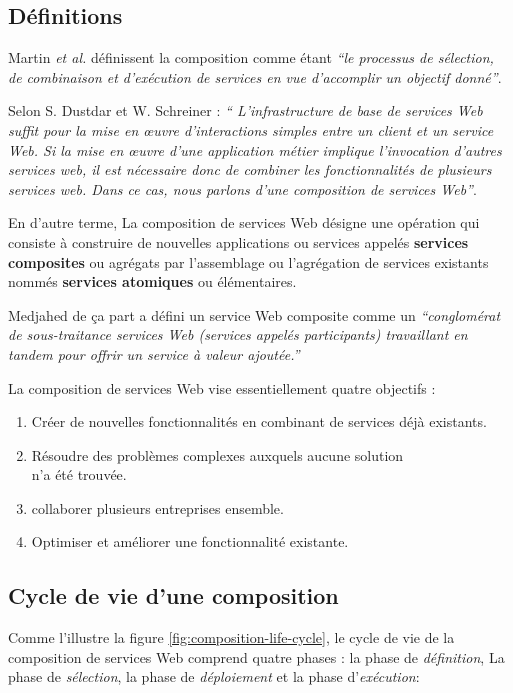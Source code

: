   \subsection{Définitions}
  \label{sec:definitions}
  Martin \emph{et al.} \cite{martin2004owl} définissent la composition
  comme étant \emph{``le processus de sélection, de combinaison et
    d'exécution de services en vue d'accomplir un objectif
    donné''}.\bigskip

  Selon S. Dustdar et W. Schreiner \cite{dustdar2005survey} : \emph{``
    L'infrastructure de base de services Web suffit pour la mise en
    œuvre d'interactions simples entre un client et un service Web. Si
    la mise en œuvre d'une application métier implique l'invocation
    d'autres services web, il est nécessaire donc de combiner les
    fonctionnalités de plusieurs services web. Dans ce cas, nous
    parlons d'une composition de services Web''}.\bigskip

  En d'autre terme, La composition de services Web désigne une
  opération qui consiste à construire de nouvelles applications ou
  services appelés \textbf{services composites} ou agrégats par
  l'assemblage ou l'agrégation de services existants nommés
  \textbf{services atomiques} ou élémentaires.\bigskip

  Medjahed \cite{medjahed2004thesis} de ça part a défini un service
  Web composite comme un \emph{``conglomérat de sous-traitance
    services Web (services appelés participants) travaillant en tandem
    pour offrir un service à valeur ajoutée.''}\bigskip

  La composition de services Web vise essentiellement quatre objectifs
  \cite{driss2011approche}:

  \begin{enumerate}
  \item Créer de nouvelles fonctionnalités en combinant de services
    déjà existants.
  \item Résoudre des problèmes complexes auxquels aucune solution\\
    n'a été trouvée.
  \item collaborer plusieurs entreprises ensemble.
  \item Optimiser et améliorer une fonctionnalité existante.
  \end{enumerate}

  \subsection{Cycle de vie d'une composition }
  \label{sec:cycle-de-vie}
  Comme l'illustre la figure \ref{fig:composition-life-cycle}, le
  cycle de vie de la composition de services Web comprend quatre
  phases \cite{sheng2014web}: la phase de \textit{définition}, La
  phase de \textit{sélection}, la phase de \textit{déploiement} et la
  phase d'\textit{exécution}:

